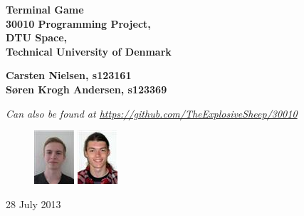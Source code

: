 \thispagestyle{empty} %
\begin{center}
\textbf{\Huge {Terminal Game}\\ \vspace{1cm}
\huge{30010 Programming Project,\\
DTU Space,\\
Technical University of Denmark
}}
\end{center}
\vspace{1cm}
\begin{center}
\Large{\textbf{Carsten Nielsen, s123161 \\ Søren Krogh Andersen, s123369}} \\
\vspace{1cm}

\emph{Can also be found at \url{https://github.com/TheExplosiveSheep/30010}}
\end{center}
\vspace{6cm}
\begin{figure}[h]
\hfill
\includegraphics{pictures/s123161.png}%
\includegraphics{pictures/s123369.png}%
\end{figure}
28 July 2013
\date{28 July 2013}

\thispagestyle{empty}
\newpage
